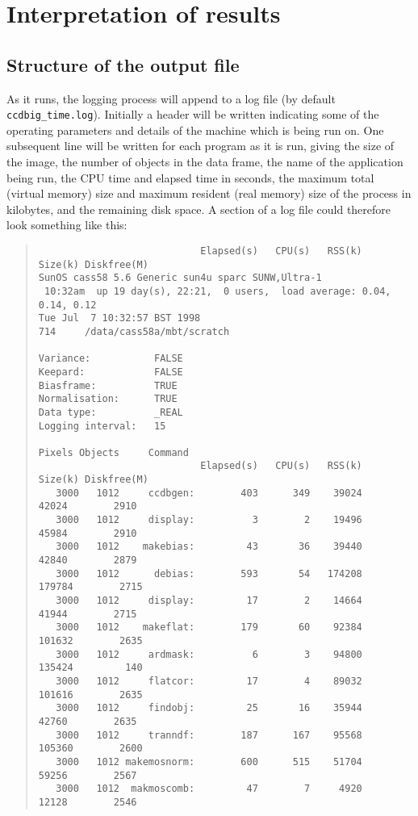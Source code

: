\section{Interpretation of results}

\subsection{Structure of the output file}

As it runs, the logging process will append to a log file 
(by default {\tt ccdbig\_time.log}).
Initially a header will be written indicating some of the
operating parameters and details of the machine which is
being run on.
One subsequent line will be written for each program as it is run,
giving
the size of the image, 
the number of objects in the data frame,
the name of the application being run,
the CPU time and
elapsed time in seconds,
the maximum total (virtual memory) size and
maximum resident (real memory) size of the process in kilobytes,
and the remaining disk space.
A section of a log file could therefore look something like this:
\begin{quote}
\begin{verbatim}
                            Elapsed(s)   CPU(s)   RSS(k)  Size(k) Diskfree(M)
SunOS cass58 5.6 Generic sun4u sparc SUNW,Ultra-1
 10:32am  up 19 day(s), 22:21,  0 users,  load average: 0.04, 0.14, 0.12
Tue Jul  7 10:32:57 BST 1998
714     /data/cass58a/mbt/scratch
 
Variance:           FALSE
Keepard:            FALSE 
Biasframe:          TRUE
Normalisation:      TRUE
Data type:          _REAL
Logging interval:   15

Pixels Objects     Command
                            Elapsed(s)   CPU(s)   RSS(k)  Size(k) Diskfree(M)
   3000   1012     ccdbgen:        403      349    39024    42024        2910
   3000   1012     display:          3        2    19496    45984        2910
   3000   1012    makebias:         43       36    39440    42840        2879
   3000   1012      debias:        593       54   174208   179784        2715
   3000   1012     display:         17        2    14664    41944        2715
   3000   1012    makeflat:        179       60    92384   101632        2635
   3000   1012     ardmask:          6        3    94800   135424         140
   3000   1012     flatcor:         17        4    89032   101616        2635
   3000   1012     findobj:         25       16    35944    42760        2635
   3000   1012     tranndf:        187      167    95568   105360        2600
   3000   1012 makemosnorm:        600      515    51704    59256        2567
   3000   1012  makmoscomb:         47        7     4920    12128        2546
\end{verbatim}
\end{quote}

